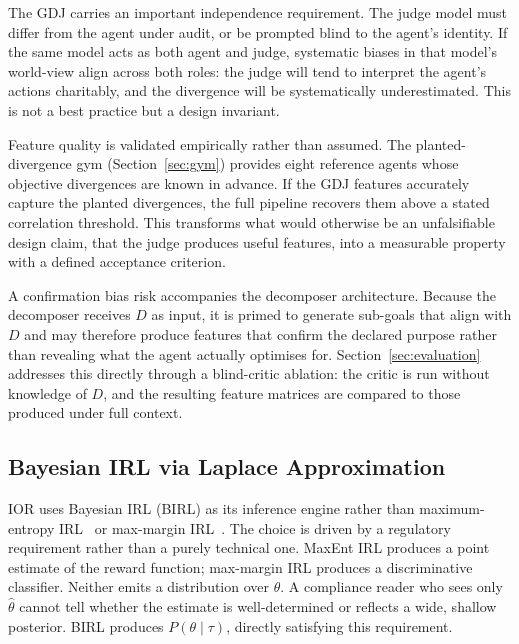 The GDJ carries an important independence requirement. The judge model must differ
from the agent under audit, or be prompted blind to the agent's identity. If the
same model acts as both agent and judge, systematic biases in that model's
world-view align across both roles: the judge will tend to interpret the agent's
actions charitably, and the divergence will be systematically underestimated. This
is not a best practice but a design invariant.

Feature quality is validated empirically rather than assumed. The
planted-divergence gym (Section~\ref{sec:gym}) provides eight reference agents
whose objective divergences are known in advance. If the GDJ features accurately
capture the planted divergences, the full pipeline recovers them above a stated
correlation threshold. This transforms what would otherwise be an unfalsifiable
design claim, that the judge produces useful features, into a measurable property
with a defined acceptance criterion.

A confirmation bias risk accompanies the decomposer architecture. Because the
decomposer receives $D$ as input, it is primed to generate sub-goals that align
with $D$ and may therefore produce features that confirm the declared purpose
rather than revealing what the agent actually optimises for.
Section~\ref{sec:evaluation} addresses this directly through a blind-critic
ablation: the critic is run without knowledge of $D$, and the resulting feature
matrices are compared to those produced under full context.

\subsection{Bayesian IRL via Laplace Approximation}

IOR uses Bayesian IRL (BIRL) as its inference engine rather than maximum-entropy
IRL~\citep{ziebart2008maxent} or max-margin IRL~\citep{ng2000algorithms}. The
choice is driven by a regulatory requirement rather than a purely technical one.
MaxEnt IRL produces a point estimate of the reward function; max-margin IRL
produces a discriminative classifier. Neither emits a distribution over $\theta$.
A compliance reader who sees only $\hat{\theta}$ cannot tell whether the estimate
is well-determined or reflects a wide, shallow posterior. BIRL produces
$P(\theta \mid \tau)$, directly satisfying this requirement.

